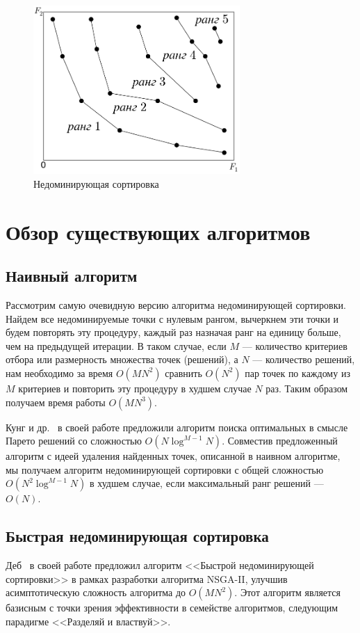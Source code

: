 \begin{figure}[h]
\centering
\includegraphics[width=0.7\textwidth]{images/nds.png}
\caption{Недоминирующая сортировка}
\label{pic0}
\end{figure}

\section{Обзор существующих алгоритмов}
\subsection{Наивный алгоритм}
Рассмотрим самую очевидную версию алгоритма недоминирующей сортировки.
Найдем все недоминируемые точки с нулевым рангом, вычеркнем эти точки и будем повторять эту процедуру, каждый раз назначая ранг на единицу больше, чем на предыдущей итерации.
В таком случае, если $M$ --- количество критериев отбора или размерность множества точек (решений), а $N$ --- количество решений, нам необходимо за время $O(MN^2)$ сравнить $O(N^2)$ пар точек по каждому из $M$ критериев и повторить эту процедуру в худшем случае $N$ раз.
Таким образом получаем время работы $O(MN^3)$.

Кунг и др.~\cite{kung75} в своей работе предложили алгоритм поиска оптимальных в смысле Парето решений со сложностью $O(N\log^{M-1}N)$.
Совместив предложенный алгоритм с идеей удаления найденных точек, описанной в наивном алгоритме, мы получаем алгоритм недоминирующей сортировки с общей сложностью $O(N^2\log^{M-1}N)$ в худшем случае, если максимальный ранг решений --- $O(N)$.

\subsection{Быстрая недоминирующая сортировка}
Деб~\cite{deb00} в своей работе предложил алгоритм <<Быстрой недоминирующей сортировки>> в рамках разработки алгоритма NSGA-II, улучшив асимптотическую сложность алгоритма до $O(MN^2)$.
Этот алгоритм является базисным с точки зрения эффективности в семействе алгоритмов, следующим парадигме <<Разделяй и властвуй>>.

